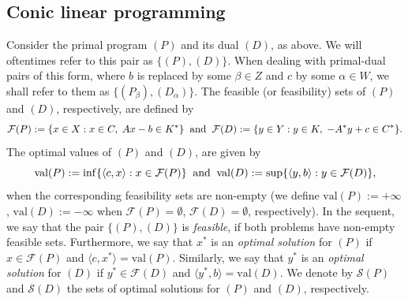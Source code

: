 \documentclass[11pt, twoside]{article}
\numberwithin{equation}{section}
\theoremstyle{definition}
\begin{document}
\vspace{-0.3cm}\subsection{Conic linear programming}\label{sec:2.1}\hypertarget{primalbeta}{}\hypertarget{dualalpha}{}\hypertarget{newprimaldual}{}\vspace{-0.2cm}

Consider the primal program \hyperlink{primal}{$(P)$} and its dual \hyperlink{dual}{$(D)$}, as above. We will oftentimes refer to this pair as \hyperlink{primaldual}{$\{(P),(D)\}$}. When dealing with primal-dual pairs of this form, where $b$ is replaced by some $\beta\in Z$ and $c$ by some $\alpha\in W$, we shall refer to them as \hyperlink{newprimaldual}{$\{(P_\beta),(D_\alpha)\}$}. The feasible (or feasibility) sets of \hyperlink{primal}{$(P)$} and \hyperlink{dual}{$(D)$}, respectively, are defined by
\begin{equation*}
    \mathcal{F}(P):= \{x\in X:x\in C,\;Ax-b\in K^*\}\mbox{\;\;and\;\;}\mathcal{F}(D):= \{y\in Y: y\in K,\;-A^*y+c\in C^*\}.  
\end{equation*}
 The optimal values of \hyperlink{primal}{$(P)$} and \hyperlink{dual}{$(D)$}, are given by
\begin{equation*}
   \text{val}(P):= \inf\{\langle c,x\rangle :x\in\mathcal{F}(P)\}\mbox{\;\;and\;\;} \text{val}(D):= \sup\{\langle y,b\rangle : y\in\mathcal{F}(D)\},
\end{equation*}
when the corresponding feasibility sets are non-empty (we define $\text{val}(P):=  +\infty$, $\text{val}(D):=  -\infty$ when $\mathcal{F}(P)=\emptyset$, $\mathcal{F}(D)=\emptyset$, respectively). In the sequent, we say that the pair \hyperlink{primaldual}{$\{(P),(D)\}$} is \textit{feasible}, if both problems have non-empty feasible sets. Furthermore, we say that $x^*$ is an \textit{optimal solution} for \hyperlink{primal}{$(P)$} if $x\in\mathcal{F}(P)$ and $\langle c,x^*\rangle=\text{val}(P)$. Similarly, we say that $y^*$ is an \textit{optimal solution} for \hyperlink{dual}{$(D)$} if $y^*\in\mathcal{F}(D)$ and $\langle y^*,b\rangle=\text{val}(D)$. We denote by $\mathcal{S}(P)$ and $\mathcal{S}(D)$ the sets of optimal solutions for \hyperlink{primal}{$(P)$} and \hyperlink{dual}{$(D)$}, respectively.\par
\end{document}
